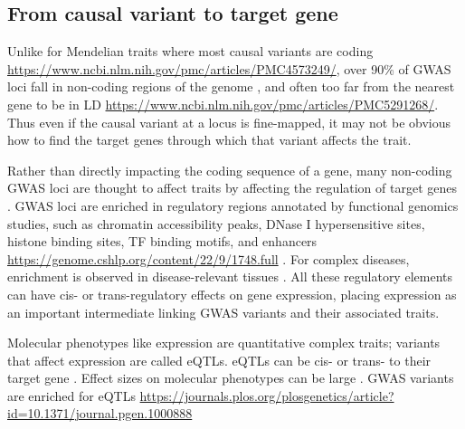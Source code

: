 \begin{outline}
\subsection{From causal variant to target gene}

\1 Unlike for Mendelian traits where most causal variants are coding \url{https://www.ncbi.nlm.nih.gov/pmc/articles/PMC4573249/}, 
over 90\% of \gls{GWAS} loci fall in non-coding regions of the genome \autocite{gallagher2018PostGWASEraAssociation},
and often too far from the nearest gene to be in \gls{LD} \url{https://www.ncbi.nlm.nih.gov/pmc/articles/PMC5291268/}.
Thus even if the causal variant at a locus is fine-mapped, 
it may not be obvious how to find the target genes through which that variant affects the trait.
%

\1 Rather than directly impacting the coding sequence of a gene, 
many non-coding GWAS loci are thought to affect traits by affecting the regulation of target genes \autocite{gallagher2018PostGWASEraAssociation}.
\gls{GWAS} loci are enriched in regulatory regions annotated by functional genomics studies, such as
    chromatin accessibility peaks, 
    DNase I hypersensitive sites,
    histone binding sites, 
    \gls{TF} binding motifs,
    and enhancers \url{https://genome.cshlp.org/content/22/9/1748.full} \autocite{gallagher2018PostGWASEraAssociation}.
For complex diseases, enrichment is observed in disease-relevant tissues \autocite{visscher201710YearsGWAS}.
All these regulatory elements can have cis- or trans-regulatory effects on gene expression,
placing expression as an important intermediate linking \gls{GWAS} variants and their associated traits.

\1 Molecular phenotypes like expression are quantitative complex traits; variants that affect expression are called \glspl{eQTL}.
    \2 eQTLs can be cis- or trans- to their target gene \autocite{albert2015RoleRegulatoryVariation}.
    \2 Effect sizes on molecular phenotypes can be large \autocite{visscher201710YearsGWAS}.
    \2 GWAS variants are enriched for eQTLs \url{https://journals.plos.org/plosgenetics/article?id=10.1371/journal.pgen.1000888}


\end{outline}
